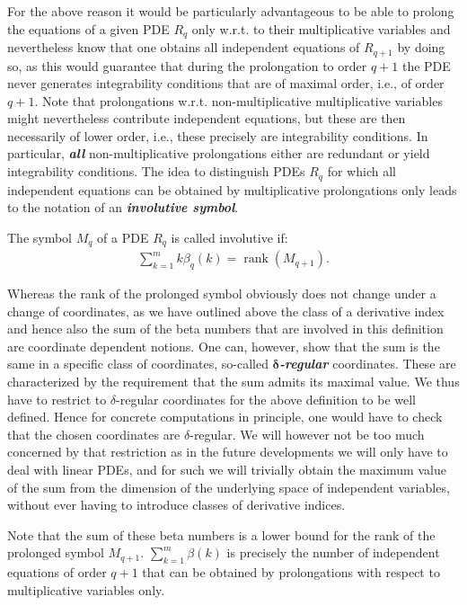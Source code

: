 For the above reason it would be particularly advantageous to be able to prolong the equations of a given PDE $R_q$ only w.r.t. to their multiplicative variables and nevertheless know that one obtains all independent equations of $R_{q+1}$ by doing so, as this would  guarantee that during the prolongation to order $q+1$ the PDE never generates integrability conditions that are of maximal order, i.e., of order $q+1$.
Note that prolongations w.r.t. non-multiplicative multiplicative variables might nevertheless contribute independent equations, but these are then necessarily of lower order, i.e., these precisely are integrability conditions.
In particular, \textit{\textbf{all}} non-multiplicative prolongations either are redundant or yield integrability conditions.
The idea to distinguish PDEs $R_q$ for which all independent equations can be obtained by multiplicative prolongations only leads to the notation of an \textit{\textbf{involutive symbol}}. 
\begin{definition}
The symbol $M_q$ of a PDE $R_q$ is called involutive if:
\begin{align}\label{sumBeta}
    \sum_{k=1}^m k\beta_q(k) = \operatorname{rank}(M_{q+1}).
\end{align}
\end{definition}
\begin{remark}
Whereas the rank of the prolonged symbol obviously does not change under a change of coordinates,
as we have outlined above the class of a derivative index and hence also the sum of the beta numbers that are involved in this definition are coordinate dependent notions. One can, however, show that the sum is the same in a specific class of coordinates, so-called \textit{\textbf{$\boldsymbol{\delta}$-regular}} coordinates. These are characterized by the requirement that the sum admits its maximal value.
We thus have to restrict to $\delta$-regular coordinates for the above definition to be well defined.
Hence for concrete computations in principle, one would have to check that the chosen coordinates are $\delta$-regular.  We will however not be too much concerned by that restriction as in the future developments we will only have to deal with linear PDEs, and for such we will trivially obtain the maximum value of the sum from the dimension of the underlying space of independent variables, without ever having to introduce classes of derivative indices.
\end{remark}
Note that the sum of these beta numbers is a lower bound for the rank of the prolonged symbol $M_{q+1}$. $\sum_{k=1}^m \beta(k)$ is precisely the number of independent equations of order $q+1$ that can be obtained by prolongations with respect to multiplicative variables only.  
